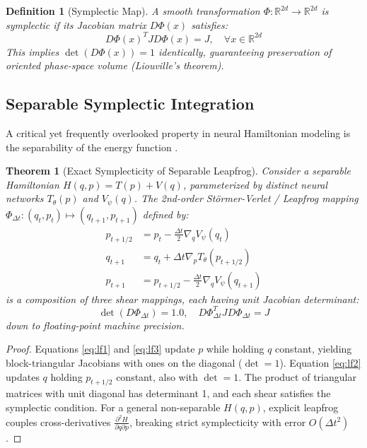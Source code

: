 \documentclass[11pt,a4paper]{article}
\newtheorem{theorem}{Theorem}
\newtheorem{definition}{Definition}
\begin{document}
\begin{definition}[Symplectic Map]
A smooth transformation $\Phi: \mathbb{R}^{2d} \to \mathbb{R}^{2d}$ is symplectic if its Jacobian matrix $D\Phi(x)$ satisfies:
\begin{equation}
D\Phi(x)^T J D\Phi(x) = J, \quad \forall x \in \mathbb{R}^{2d}
\end{equation}
This implies $\det(D\Phi(x)) = 1$ identically, guaranteeing preservation of oriented phase-space volume (Liouville's theorem).
\end{definition}

\subsection{Separable Symplectic Integration}
A critical yet frequently overlooked property in neural Hamiltonian modeling is the separability of the energy function \cite{hairer2006geometric, tao2016explicit}.

\begin{theorem}[Exact Symplecticity of Separable Leapfrog]
Consider a separable Hamiltonian $H(q, p) = T(p) + V(q)$, parameterized by distinct neural networks $T_\theta(p)$ and $V_\psi(q)$. The 2nd-order St\"ormer-Verlet / Leapfrog mapping $\Phi_{\Delta t}: (q_t, p_t) \mapsto (q_{t+1}, p_{t+1})$ defined by:
\begin{align}
p_{t+1/2} &= p_t - \frac{\Delta t}{2} \nabla_q V_\psi(q_t) \label{eq:lf1} \\
q_{t+1}   &= q_t + \Delta t \nabla_p T_\theta(p_{t+1/2}) \label{eq:lf2} \\
p_{t+1}   &= p_{t+1/2} - \frac{\Delta t}{2} \nabla_q V_\psi(q_{t+1}) \label{eq:lf3}
\end{align}
is a composition of three shear mappings, each having unit Jacobian determinant:
\begin{equation}
\det(D\Phi_{\Delta t}) = 1.0, \quad D\Phi_{\Delta t}^T J D\Phi_{\Delta t} = J
\end{equation}
down to floating-point machine precision.
\end{theorem}
\begin{proof}
Equations \eqref{eq:lf1} and \eqref{eq:lf3} update $p$ while holding $q$ constant, yielding block-triangular Jacobians with ones on the diagonal ($\det = 1$). Equation \eqref{eq:lf2} updates $q$ holding $p_{t+1/2}$ constant, also with $\det = 1$. The product of triangular matrices with unit diagonal has determinant 1, and each shear satisfies the symplectic condition. For a general non-separable $H(q, p)$, explicit leapfrog couples cross-derivatives $\frac{\partial^2 H}{\partial q \partial p}$, breaking strict symplecticity with error $O(\Delta t^2)$.
\end{proof}
\end{document}
